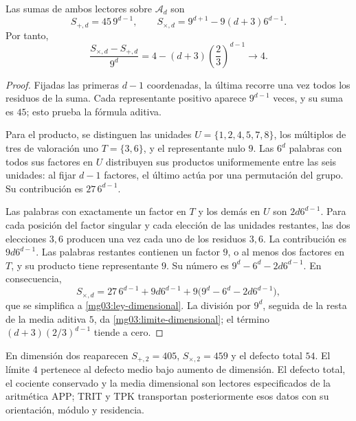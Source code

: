 \begin{proposition}
Las sumas de ambos lectores sobre \(\mathcal A_d\) son
\begin{equation}
 S_{+,d}=45\,9^{d-1},\qquad
 S_{\times,d}=9^{d+1}-9(d+3)6^{d-1}.
 \label{mg03:ley-dimensional}
\end{equation}
Por tanto,
\begin{equation}
 \frac{S_{\times,d}-S_{+,d}}{9^d}
 =4-(d+3)\left(\frac23\right)^{d-1}
 \longrightarrow4.
 \label{mg03:limite-dimensional}
\end{equation}
\end{proposition}

\begin{proof}
Fijadas las primeras \(d-1\) coordenadas, la última recorre una vez
todos los residuos de la suma. Cada representante positivo aparece
\(9^{d-1}\) veces, y su suma es \(45\); esto prueba la fórmula
aditiva.

Para el producto, se distinguen las unidades
\(U=\{1,2,4,5,7,8\}\), los múltiplos de tres de valoración uno
\(T=\{3,6\}\), y el representante nulo \(9\). Las \(6^d\)
palabras con todos sus factores en \(U\) distribuyen sus productos
uniformemente entre las seis unidades: al fijar \(d-1\) factores,
el último actúa por una permutación del grupo. Su contribución es
\(27\,6^{d-1}\).

Las palabras con exactamente un factor en \(T\) y los demás en
\(U\) son \(2d6^{d-1}\). Para cada posición del factor singular y
cada elección de las unidades restantes, las dos elecciones \(3,6\)
producen una vez cada uno de los residuos \(3,6\). La contribución
es \(9d6^{d-1}\). Las palabras restantes contienen un factor
\(9\), o al menos dos factores en \(T\), y su producto tiene
representante \(9\). Su número es
\(9^d-6^d-2d6^{d-1}\). En consecuencia,
\[
 S_{\times,d}=27\,6^{d-1}+9d6^{d-1}
 +9\bigl(9^d-6^d-2d6^{d-1}\bigr),
\]
que se simplifica a \eqref{mg03:ley-dimensional}. La división por
\(9^d\), seguida de la resta de la media aditiva \(5\), da
\eqref{mg03:limite-dimensional}; el término
\((d+3)(2/3)^{d-1}\) tiende a cero.
\end{proof}

En dimensión dos reaparecen \(S_{+,2}=405\),
\(S_{\times,2}=459\) y el defecto total \(54\). El límite
\(4\) pertenece al defecto medio bajo aumento de dimensión. El
defecto total, el cociente conservado y la media dimensional son
lectores especificados de la aritmética APP; TRIT y TPK transportan
posteriormente esos datos con su orientación, módulo y residencia.
